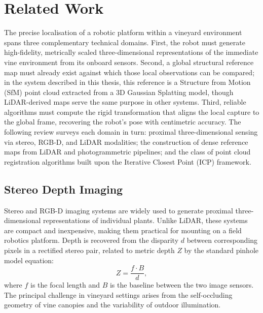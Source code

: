 \section{Related Work}
\label{sec:precise-alignment-related-work}

The precise localisation of a robotic platform within a vineyard environment spans three complementary technical domains. First, the robot must generate high-fidelity, metrically scaled three-dimensional representations of the immediate vine environment from its onboard sensors. Second, a global structural reference map must already exist against which those local observations can be compared; in the system described in this thesis, this reference is a Structure from Motion (SfM) point cloud extracted from a 3D Gaussian Splatting model, though LiDAR-derived maps serve the same purpose in other systems. Third, reliable algorithms must compute the rigid transformation that aligns the local capture to the global frame, recovering the robot's pose with centimetric accuracy. The following review surveys each domain in turn: proximal three-dimensional sensing via stereo, RGB-D, and LiDAR modalities; the construction of dense reference maps from LiDAR and photogrammetric pipelines; and the class of point cloud registration algorithms built upon the Iterative Closest Point (ICP) framework.

\subsection{Stereo Depth Imaging}
\label{subsec:stereo-depth}

Stereo and RGB-D imaging systems are widely used to generate proximal three-dimensional representations of individual plants. Unlike LiDAR, these systems are compact and inexpensive, making them practical for mounting on a field robotics platform. Depth is recovered from the disparity $d$ between corresponding pixels in a rectified stereo pair, related to metric depth $Z$ by the standard pinhole model equation:
%
\begin{equation}
    Z = \frac{f \cdot B}{d},
\end{equation}
%
where $f$ is the focal length and $B$ is the baseline between the two image sensors. The principal challenge in vineyard settings arises from the self-occluding geometry of vine canopies and the variability of outdoor illumination.

